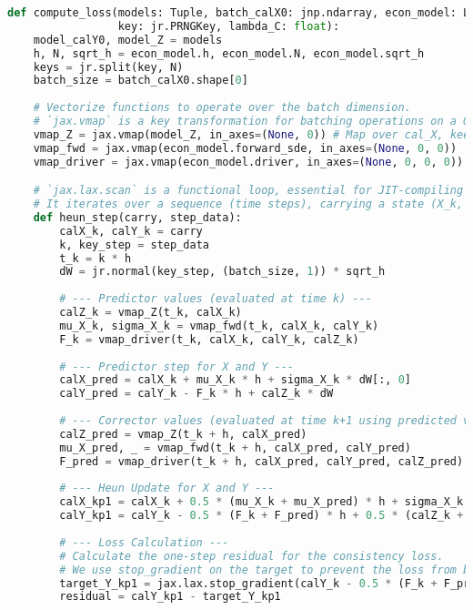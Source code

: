 \documentclass[11pt,letterpaper,oneside]{article}
\theoremstyle{plain}
\theoremstyle{definition}
\theoremstyle{remark}
\begin{document}
\begin{lstlisting}[language=Python, caption={C.4: JAX Implementation of the Consistency-Regularized Loss with Heun Scheme.}, label={lst:jax_loss_fn_app_appendix}]
def compute_loss(models: Tuple, batch_calX0: jnp.ndarray, econ_model: LucasGEModel, 
                 key: jr.PRNGKey, lambda_C: float):
    model_calY0, model_Z = models
    h, N, sqrt_h = econ_model.h, econ_model.N, econ_model.sqrt_h
    keys = jr.split(key, N)
    batch_size = batch_calX0.shape[0]
    
    # Vectorize functions to operate over the batch dimension.
    # `jax.vmap` is a key transformation for batching operations on a GPU/TPU.
    vmap_Z = jax.vmap(model_Z, in_axes=(None, 0)) # Map over cal_X, keep t fixed
    vmap_fwd = jax.vmap(econ_model.forward_sde, in_axes=(None, 0, 0))
    vmap_driver = jax.vmap(econ_model.driver, in_axes=(None, 0, 0, 0))

    # `jax.lax.scan` is a functional loop, essential for JIT-compiling simulations.
    # It iterates over a sequence (time steps), carrying a state (X_k, Y_k).
    def heun_step(carry, step_data):
        calX_k, calY_k = carry
        k, key_step = step_data
        t_k = k * h
        dW = jr.normal(key_step, (batch_size, 1)) * sqrt_h
        
        # --- Predictor values (evaluated at time k) ---
        calZ_k = vmap_Z(t_k, calX_k)
        mu_X_k, sigma_X_k = vmap_fwd(t_k, calX_k, calY_k)
        F_k = vmap_driver(t_k, calX_k, calY_k, calZ_k)
        
        # --- Predictor step for X and Y ---
        calX_pred = calX_k + mu_X_k * h + sigma_X_k * dW[:, 0]
        calY_pred = calY_k - F_k * h + calZ_k * dW
        
        # --- Corrector values (evaluated at time k+1 using predicted values) ---
        calZ_pred = vmap_Z(t_k + h, calX_pred)
        mu_X_pred, _ = vmap_fwd(t_k + h, calX_pred, calY_pred)
        F_pred = vmap_driver(t_k + h, calX_pred, calY_pred, calZ_pred)
        
        # --- Heun Update for X and Y ---
        calX_kp1 = calX_k + 0.5 * (mu_X_k + mu_X_pred) * h + sigma_X_k * dW[:, 0]
        calY_kp1 = calY_k - 0.5 * (F_k + F_pred) * h + 0.5 * (calZ_k + calZ_pred) * dW
        
        # --- Loss Calculation ---
        # Calculate the one-step residual for the consistency loss.
        # We use stop_gradient on the target to prevent the loss from being zero by construction.
        target_Y_kp1 = jax.lax.stop_gradient(calY_k - 0.5 * (F_k + F_pred) * h + 0.5 * (calZ_k + calZ_pred) * dW)
        residual = calY_kp1 - target_Y_kp1
        

\end{lstlisting}
\end{document}
